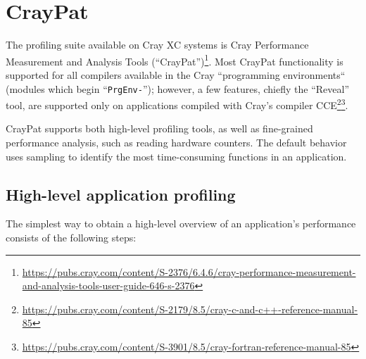 \section{CrayPat}

The profiling suite available on Cray XC systems is Cray Performance
Measurement and Analysis Tools
(``CrayPat'')\footnote{\url{https://pubs.cray.com/content/S-2376/6.4.6/cray-performance-measurement-and-analysis-tools-user-guide-646-s-2376}}.
Most CrayPat functionality is supported for all compilers available in the Cray
``programming environments`` (modules which begin ``\texttt{PrgEnv-}'');
however, a few features, chiefly the ``Reveal'' tool, are supported only on
applications compiled with Cray's compiler
CCE\footnote{\url{https://pubs.cray.com/content/S-2179/8.5/cray-c-and-c++-reference-manual-85}}\footnote{\url{https://pubs.cray.com/content/S-3901/8.5/cray-fortran-reference-manual-85}}.

CrayPat supports both high-level profiling tools, as well as fine-grained
performance analysis, such as reading hardware counters. The default behavior
uses sampling to identify the most time-consuming functions in an application.

\subsection{High-level application profiling}

The simplest way to obtain a high-level overview of an application's performance consists of the following steps:

